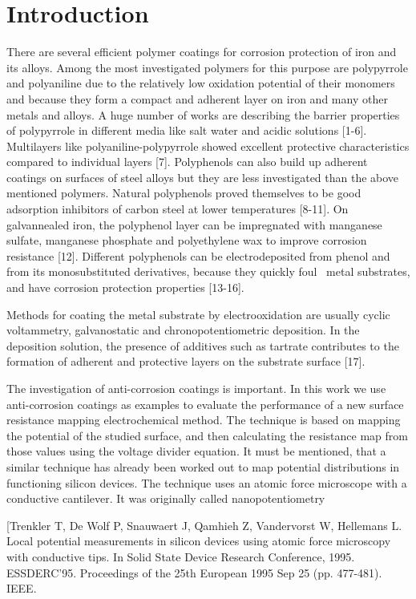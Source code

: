\documentclass[3p]{elsarticle}
\begin{document}
\section{Introduction}
There are several efficient polymer coatings for corrosion protection of iron and its alloys. Among the most investigated polymers for this purpose are polypyrrole and polyaniline due to the relatively low oxidation potential of their monomers and because they form a compact and adherent layer on iron and many other metals and alloys. A huge number of works are describing the barrier properties of polypyrrole in different media like salt water and acidic solutions [1-6]. Multilayers like polyaniline-polypyrrole showed excellent protective characteristics compared to individual layers [7]. Polyphenols can also build up adherent coatings on surfaces of steel alloys but they are less investigated than the above mentioned polymers. Natural polyphenols proved themselves to be good adsorption inhibitors of carbon steel at lower temperatures [8-11]. On galvannealed iron, the polyphenol layer can be impregnated with manganese sulfate, manganese phosphate and polyethylene wax to improve corrosion resistance [12]. Different polyphenols can be electrodeposited from phenol and from its monosubstituted derivatives, because they quickly foul  metal substrates, and have corrosion protection properties [13-16].

Methods for coating the metal substrate by electrooxidation are usually cyclic voltammetry, galvanostatic and chronopotentiometric deposition. In the deposition solution, the presence of additives such as tartrate contributes to the formation of adherent and protective layers on the substrate surface [17].

The investigation of anti-corrosion coatings is important. In this work we use anti-corrosion coatings as examples to evaluate the performance of a new surface resistance mapping electrochemical method. The technique is based on mapping the potential of the studied surface, and then calculating the resistance map from those values using the voltage divider equation. It must be mentioned, that a similar technique has already been worked out to map potential distributions in functioning silicon devices. The technique uses an atomic force microscope with a conductive cantilever. It was originally called nanopotentiometry 

[Trenkler T, De Wolf P, Snauwaert J, Qamhieh Z, Vandervorst W, Hellemans L. Local potential measurements in silicon devices using atomic force microscopy with conductive tips. In Solid State Device Research Conference, 1995. ESSDERC'95. Proceedings of the 25th European 1995 Sep 25 (pp. 477-481). IEEE.
\end{document}
